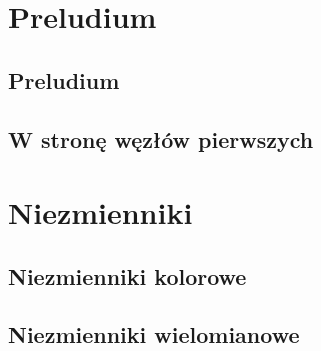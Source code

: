 \documentclass{LegrandOrangeBook}
\begin{document}
\pagestyle{empty} %






\tableofcontents

\pagestyle{fancy} %
\cleardoublepage %

\chapterspaceabove{5.75cm} %
\chapterspacebelow{7.25cm} %

\part{Preludium}
\chapter{Preludium}




\chapter{W stronę węzłów pierwszych}




\part{Niezmienniki}
\chapter{Niezmienniki kolorowe}





\chapter{Niezmienniki wielomianowe}







\end{document}
